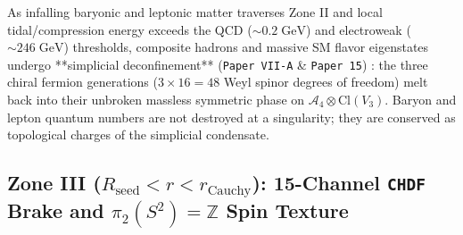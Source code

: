\documentclass[11pt,a4paper]{article}
\theoremstyle{remark}
\begin{document}
As infalling baryonic and leptonic matter traverses Zone II and local tidal/compression energy exceeds the QCD ($\sim 0.2\;\mathrm{GeV}$) and electroweak ($\sim 246\;\mathrm{GeV}$) thresholds, composite hadrons and massive SM flavor eigenstates undergo **simplicial deconfinement** (\texttt{Paper VII-A} \& \texttt{Paper 15}) \cite{JolcsakTauFoundationSeries2026}: the three chiral fermion generations ($3 \times 16 = 48$ Weyl spinor degrees of freedom) melt back into their unbroken massless symmetric phase on $\mathcal{A}_4 \otimes \mathrm{Cl}(V_3)$. Baryon and lepton quantum numbers are not destroyed at a singularity; they are conserved as topological charges of the simplicial condensate.

\subsection{Zone III (\texorpdfstring{$R_{\mathrm{seed}} < r < r_{\mathrm{Cauchy}}$}{R\_seed < r < r\_Cauchy}): 15-Channel \texttt{CHDF} Brake and \texorpdfstring{$\pi_2(S^2) = \mathbb{Z}$}{pi\_2(S\^2) = Z} Spin Texture}
\end{document}
